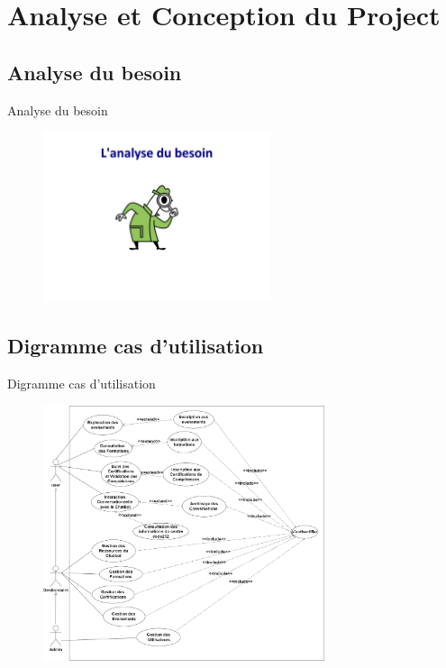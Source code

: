 \documentclass[aspectratio=169]{beamer}
\begin{document}
\section{Analyse et Conception du Project}
\subsection{Analyse du besoin}
\begin{frame}{Analyse du besoin}
    \begin{figure}[htpb]
        \centering
        \includegraphics[height=5cm]{pic/analyse-besoin.jpg}
    \end{figure}

\end{frame}

\subsection{Digramme cas d'utilisation}
\begin{frame}{Digramme cas d'utilisation}
    \begin{figure}[htpb]
        \centering
        \includegraphics[height=7.5cm]{pic/usecase.png}
    \end{figure}
\end{frame}
\end{document}
